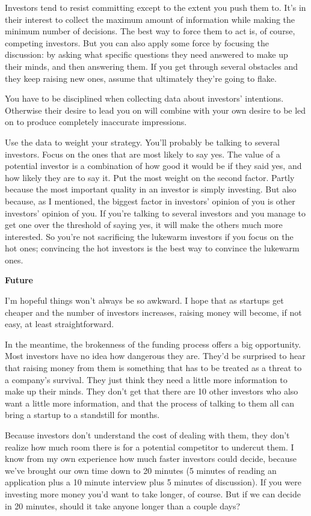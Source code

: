 Investors tend to resist committing except to the extent you push them
to. It's in their interest to collect the maximum amount of information
while making the minimum number of decisions. The best way to force them
to act is, of course, competing investors. But you can also apply some
force by focusing the discussion: by asking what specific questions they
need answered to make up their minds, and then answering them. If you
get through several obstacles and they keep raising new ones, assume
that ultimately they're going to flake.

You have to be disciplined when collecting data about investors'
intentions. Otherwise their desire to lead you on will combine with your
own desire to be led on to produce completely inaccurate impressions.

Use the data to weight your strategy. You'll probably be talking to
several investors. Focus on the ones that are most likely to say yes.
The value of a potential investor is a combination of how good it would
be if they said yes, and how likely they are to say it. Put the most
weight on the second factor. Partly because the most important quality
in an investor is simply investing. But also because, as I mentioned,
the biggest factor in investors' opinion of you is other investors'
opinion of you. If you're talking to several investors and you manage to
get one over the threshold of saying yes, it will make the others much
more interested. So you're not sacrificing the lukewarm investors if you
focus on the hot ones; convincing the hot investors is the best way to
convince the lukewarm ones.

\textbf{Future}

I'm hopeful things won't always be so awkward. I hope that as startups
get cheaper and the number of investors increases, raising money will
become, if not easy, at least straightforward.

In the meantime, the brokenness of the funding process offers a big
opportunity. Most investors have no idea how dangerous they are. They'd
be surprised to hear that raising money from them is something that has
to be treated as a threat to a company's survival. They just think they
need a little more information to make up their minds. They don't get
that there are 10 other investors who also want a little more
information, and that the process of talking to them all can bring a
startup to a standstill for months.

Because investors don't understand the cost of dealing with them, they
don't realize how much room there is for a potential competitor to
undercut them. I know from my own experience how much faster investors
could decide, because we've brought our own time down to 20 minutes (5
minutes of reading an application plus a 10 minute interview plus 5
minutes of discussion). If you were investing more money you'd want to
take longer, of course. But if we can decide in 20 minutes, should it
take anyone longer than a couple days?

